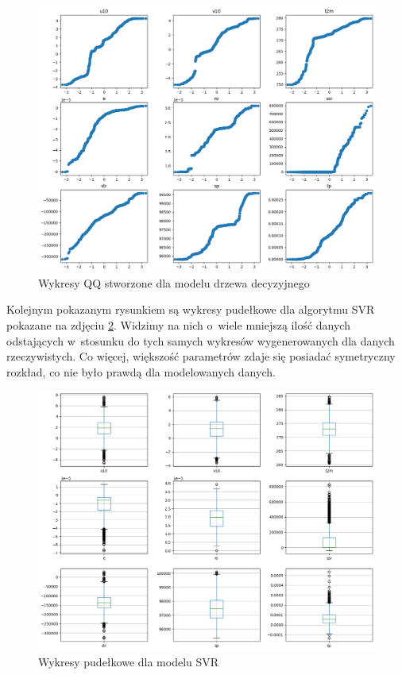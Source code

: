 \begin{figure}[H]
    \centering
    \includegraphics[width=\textwidth]{images/dt_qq.png}
    \caption[Wykresy Q-Q dla drzewa decyzyjnego]{Wykresy QQ stworzone dla modelu drzewa decyzyjnego}
    \label{dt-qq}
\end{figure}

Kolejnym pokazanym rysunkiem są wykresy pudełkowe dla algorytmu SVR pokazane na zdjęciu \ref{svr-box}. 
Widzimy na nich o~wiele mniejszą ilość
danych odstających w~stosunku do tych samych wykresów wygenerowanych dla danych rzeczywistych. Co więcej,
większość parametrów zdaje się posiadać symetryczny rozkład, co nie było prawdą dla modelowanych danych.

\begin{figure}[H]
    \centering
    \includegraphics[width=.8\textwidth]{images/svr_box.png}
    \caption[Wykresy pudełkowe dla SVR]{Wykresy pudełkowe dla modelu SVR}
    \label{svr-box}
\end{figure}


